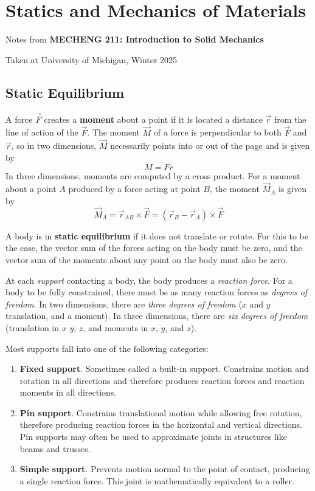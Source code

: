 \section{Statics and Mechanics of Materials}

\begin{center}
    Notes from \textbf{MECHENG 211: Introduction to Solid Mechanics}

    Taken at University of Michigan, Winter 2025
\end{center}

\subsection{Static Equilibrium} %

A force $\vec{F}$ creates a \textbf{moment} about a point if it is located a distance $\vec{r}$ from the line of action of the $\vec{F}$. The moment $\vec{M}$ of a force is perpendicular to both $\vec{F}$ and $\vec{r}$, so in two dimensions, $\vec{M}$ necessarily points into or out of the page and is given by \[M = Fr\] In three dimensions, moments are computed by a cross product. For a moment about a point $A$ produced by a force acting at point $B$, the moment $\vec{M}_A$ is given by \[\vec{M}_A = \vec{r}_{AB}\times \vec{F} = (\vec{r}_B-\vec{r}_A)\times \vec{F}\]

A body is in \textbf{static equilibrium} if it does not translate or rotate. For this to be the case, the vector sum of the forces acting on the body must be zero, and the vector sum of the moments about any point on the body must also be zero. 

At each \textit{support} contacting a body, the body produces a \textit{reaction force}. For a body to be fully constrained, there must be as many reaction forces as \textit{degrees of freedom}. In two dimensions, there are \textit{three degrees of freedom} ($x$ and $y$ translation, and a moment). In three dimensions, there are \textit{six degrees of freedom} (translation in $x$ $y$, $z$, and moments in $x$, $y$, and $z$).

Most supports fall into one of the following categories:
\begin{enumerate}
    \item[] \textbf{Fixed support}. Sometimes called a built-in support. Constrains motion and rotation in all directions and therefore produces reaction forces and reaction moments in all directions.
    \item[] \textbf{Pin support}. Constrains translational motion while allowing free rotation, therefore producing reaction forces in the horizontal and vertical directions. Pin supports may often be used to approximate joints in structures like beams and trusses.
    \item[] \textbf{Simple support}. Prevents motion normal to the point of contact, producing a single reaction force. This joint is mathematically equivalent to a roller.
\end{enumerate}

